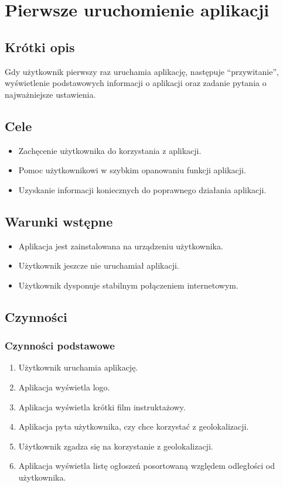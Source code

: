 \documentclass[12pt,a4paper,twoside]{article}
\begin{document}
    \section{Pierwsze uruchomienie aplikacji}


    \subsection{Krótki opis}
    Gdy użytkownik pierwszy raz uruchamia aplikację, następuje ``przywitanie'', wyświetlenie podstawowych informacji o aplikacji oraz zadanie pytania o najważniejsze ustawienia.


    \subsection{Cele}
    \begin{itemize}
        \item Zachęcenie użytkownika do korzystania z aplikacji.
        \item Pomoc użytkownikowi w szybkim opanowaniu funkcji aplikacji.
        \item Uzyskanie informacji koniecznych do poprawnego działania aplikacji.
    \end{itemize}


    \subsection{Warunki wstępne}
    \begin{itemize}
        \item Aplikacja jest zainstalowana na urządzeniu użytkownika.
        \item Użytkownik jeszcze nie uruchamiał aplikacji.
        \item Użytkownik dysponuje stabilnym połączeniem internetowym.
    \end{itemize}


    \subsection{Czynności}

    \subsubsection{Czynności podstawowe}


    \begin{enumerate}
        \item Użytkownik uruchamia aplikację.
        \item Aplikacja wyświetla logo.
        \item Aplikacja wyświetla krótki film instruktażowy.
        \item Aplikacja pyta użytkownika, czy chce korzystać z geolokalizacji.
        \item Użytkownik zgadza się na korzystanie z geolokalizacji.
        \item Aplikacja wyświetla listę ogłoszeń posortowaną względem odległości od użytkownika.
    \end{enumerate}
\end{document}
